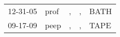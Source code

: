 \begin{supertabular}{lllll}
 12-31-05 &  prof &  , &  , &  BATH \\
 09-17-09 &  peep &  , &  , &  TAPE \\
\end{supertabular}
